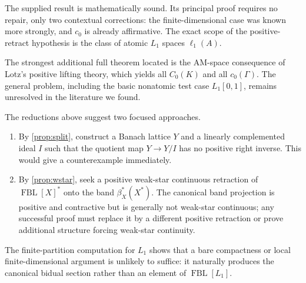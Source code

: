 \documentclass[11pt]{article}
\newcommand{\FBL}{\operatorname{FBL}}
\begin{document}
The supplied result is mathematically sound.  Its principal proof requires no
repair, only two contextual corrections: the finite-dimensional case was
known more strongly, and $c_0$ is already affirmative.  The exact scope of the
positive-retract hypothesis is the class of atomic $L_1$ spaces
$\ell_1(A)$.

The strongest additional full theorem located is the AM-space consequence of
Lotz's positive lifting theory, which yields all $C_0(K)$ and all
$c_0(\Gamma)$.  The general problem, including the basic nonatomic test case
$L_1[0,1]$, remains unresolved in the literature we found.

The reductions above suggest two focused approaches.
\begin{enumerate}[label=(\arabic*),leftmargin=2.2em]
\item By \cref{prop:split}, construct a Banach lattice $Y$ and a linearly
complemented ideal $I$ such that the quotient map $Y\to Y/I$ has no positive
right inverse.  This would give a counterexample immediately.
\item By \cref{prop:wstar}, seek a positive weak-star continuous retraction of
$\FBL[X]^*$ onto the band $\beta_X^*(X^*)$.  The canonical band projection is
positive and contractive but is generally not weak-star continuous; any
successful proof must replace it by a different positive retraction or prove
additional structure forcing weak-star continuity.
\end{enumerate}

The finite-partition computation for $L_1$ shows that a bare compactness or
local finite-dimensional argument is unlikely to suffice: it naturally
produces the canonical bidual section rather than an element of
$\FBL[L_1]$.
\end{document}
